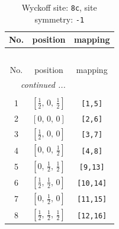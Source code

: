 \documentclass[fleqn,8pt]{jsarticle}
\begin{document}
\renewcommand{\arraystretch}{1.2}
\begin{longtable}{ccc}
\caption{Wyckoff site: {\tt 8c}, site symmetry: {\tt -1}}
 \\
 \hline \hline
No. & position & mapping \\ \hline \endfirsthead

\multicolumn{2}{l}{\tablename\ \thetable{}} \\
 \hline \hline
No. & position & mapping \\ \hline \endhead

 \hline \hline
\multicolumn{2}{r}{\footnotesize\it continued ...} \\ \endfoot

 \hline \hline
\multicolumn{2}{r}{} \\ \endlastfoot

1 & $\left[ \frac{1}{2},\, 0,\, \frac{1}{2} \right]$ & {\tt [1,5]} \\ \hline
2 & $\left[ 0,\, 0,\, 0 \right]$ & {\tt [2,6]} \\ \hline
3 & $\left[ \frac{1}{2},\, 0,\, 0 \right]$ & {\tt [3,7]} \\ \hline
4 & $\left[ 0,\, 0,\, \frac{1}{2} \right]$ & {\tt [4,8]} \\ \hline
5 & $\left[ 0,\, \frac{1}{2},\, \frac{1}{2} \right]$ & {\tt [9,13]} \\ \hline
6 & $\left[ \frac{1}{2},\, \frac{1}{2},\, 0 \right]$ & {\tt [10,14]} \\ \hline
7 & $\left[ 0,\, \frac{1}{2},\, 0 \right]$ & {\tt [11,15]} \\ \hline
8 & $\left[ \frac{1}{2},\, \frac{1}{2},\, \frac{1}{2} \right]$ & {\tt [12,16]} \\
\end{longtable}
\renewcommand{\arraystretch}{1.2}
\end{document}
